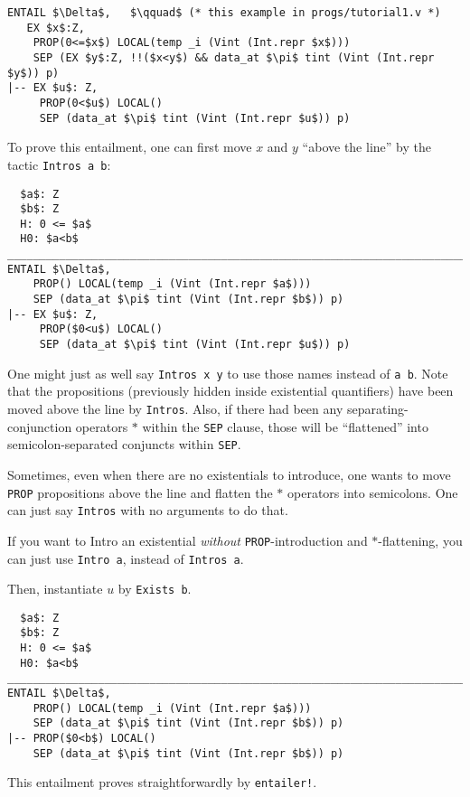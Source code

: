 \documentclass[12pt,fleqn,openany,oneside,showtrims]{memoir}
\begin{document}
\begin{lstlisting}
ENTAIL $\Delta$,   $\qquad$ (* this example in progs/tutorial1.v *)
   EX $x$:Z,
    PROP(0<=$x$) LOCAL(temp _i (Vint (Int.repr $x$)))
    SEP (EX $y$:Z, !!($x<y$) && data_at $\pi$ tint (Vint (Int.repr $y$)) p)
|-- EX $u$: Z,
     PROP(0<$u$) LOCAL()
     SEP (data_at $\pi$ tint (Vint (Int.repr $u$)) p)
\end{lstlisting}
To prove this entailment, one can first move $x$ and $y$ ``above
the line'' by the tactic \lstinline{Intros a b}:
\begin{lstlisting}
  $a$: Z
  $b$: Z
  H: 0 <= $a$
  H0: $a<b$
_______________________________________________________________________________
ENTAIL $\Delta$,
    PROP() LOCAL(temp _i (Vint (Int.repr $a$)))
    SEP (data_at $\pi$ tint (Vint (Int.repr $b$)) p)
|-- EX $u$: Z,
     PROP($0<u$) LOCAL()
     SEP (data_at $\pi$ tint (Vint (Int.repr $u$)) p)
\end{lstlisting}
One might just as well say \lstinline{Intros x y}
to use those names instead of \lstinline{a b}.
Note that the propositions (previously hidden inside
existential quantifiers) have been moved above the line
by \lstinline{Intros}.  Also, if there had been any
separating-conjunction operators $*$ within the \lstinline{SEP}
clause, those will be ``flattened'' into semicolon-separated
conjuncts within \lstinline{SEP}.

Sometimes, even when there are no existentials to introduce,
one wants to move \lstinline{PROP} propositions
above the line and flatten the $*$ operators into semicolons.
One can just say \lstinline{Intros} with no arguments to do that.

If you want to Intro an existential \emph{without}
\lstinline{PROP}-introduction and \linebreak $*$-flattening, you can
just use \lstinline{Intro a}, instead of \lstinline{Intros a}.

Then, instantiate $u$ by \lstinline{Exists b}.
\begin{lstlisting}
  $a$: Z
  $b$: Z
  H: 0 <= $a$
  H0: $a<b$
_______________________________________________________________________________
ENTAIL $\Delta$,
    PROP() LOCAL(temp _i (Vint (Int.repr $a$)))
    SEP (data_at $\pi$ tint (Vint (Int.repr $b$)) p)
|-- PROP($0<b$) LOCAL()
    SEP (data_at $\pi$ tint (Vint (Int.repr $b$)) p)
\end{lstlisting}
This entailment proves straightforwardly by
\lstinline{entailer!}.
\end{document}
